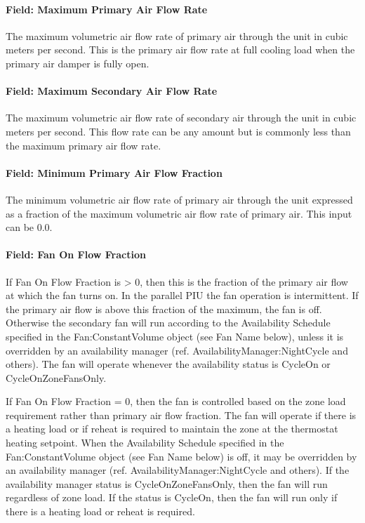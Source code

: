 \paragraph{Field: Maximum Primary Air Flow Rate}\label{field-maximum-primary-air-flow-rate-1}

The maximum volumetric air flow rate of primary air through the unit in cubic meters per second. This is the primary air flow rate at full cooling load when the primary air damper is fully open.

\paragraph{Field: Maximum Secondary Air Flow Rate}\label{field-maximum-secondary-air-flow-rate}

The maximum volumetric air flow rate of secondary air through the unit in cubic meters per second. This flow rate can be any amount but is commonly less than the maximum primary air flow rate.

\paragraph{Field: Minimum Primary Air Flow Fraction}\label{field-minimum-primary-air-flow-fraction-1}

The minimum volumetric air flow rate of primary air through the unit expressed as a fraction of the maximum volumetric air flow rate of primary air. This input can be 0.0.

\paragraph{Field: Fan On Flow Fraction}\label{field-fan-on-flow-fraction}

If Fan On Flow Fraction is > 0, then this is the fraction of the primary air flow at which the fan turns on. In the parallel PIU the fan operation is intermittent. If the primary air flow is above this fraction of the maximum, the fan is off. Otherwise the secondary fan will run according to the Availability Schedule specified in the Fan:ConstantVolume object (see Fan Name below), unless it is overridden by an availability manager (ref. AvailabilityManager:NightCycle and others). The fan will operate whenever the availability status is CycleOn or CycleOnZoneFansOnly.

If Fan On Flow Fraction = 0, then the fan is controlled based on the zone load requirement rather than primary air flow fraction. The fan will operate if there is a heating load or if reheat is required to maintain the zone at the thermostat heating setpoint. When the Availability Schedule specified in the Fan:ConstantVolume object (see Fan Name below) is off, it may be overridden by an availability manager (ref. AvailabilityManager:NightCycle and others). If the availability manager status is CycleOnZoneFansOnly, then the fan will run regardless of zone load.  If the status is CycleOn, then the fan will run only if there is a heating load or reheat is required.

